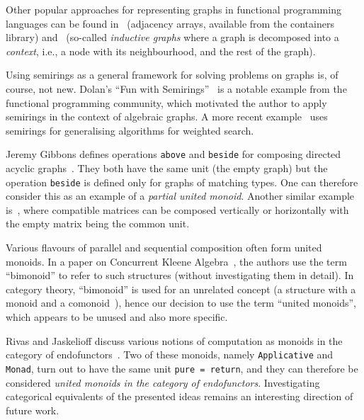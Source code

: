 \documentclass[english,submission]{programming}
\newcommand{\code}[1]{\lstinline[mathescape]|#1|}
\newcommand{\hcode}[1]{{\color{darkblue} \lstinline[keywordstyle={}]|#1|}} %
\begin{document}
Other popular approaches for representing graphs in functional programming
languages can be found in~\cite{1995_king_graphs}\cite{1994_launchbury_st}
(adjacency arrays, available from the \textsf{containers} library)
and~\cite{2001_erwig_inductive} (so-called \emph{inductive graphs} where a graph
is decomposed into a \emph{context}, i.e., a node with its neighbourhood, and
the rest of the graph).

Using semirings as a general framework for solving problems on graphs is, of
course, not new. Dolan's ``Fun with Semirings''~\cite{2013_semirings_dolan} is a
notable example from the functional programming community, which motivated the
author to apply semirings in the context of algebraic graphs. A more recent
example~\cite{weighted_search} uses semirings for generalising algorithms for
weighted search.


Jeremy Gibbons defines operations \code{above} and \code{beside} for composing
directed acyclic graphs~\cite{1995_gibbons_algebra}. They both have the same
unit (the empty graph) but the operation \code{beside} is defined only for
graphs of matching types. One can therefore consider this as an example of a
\emph{partial united monoid}. Another similar example is~\cite{typed_matrices},
where compatible matrices can be composed vertically or horizontally with the
empty matrix being the common unit.

Various flavours of parallel and sequential composition often form united
monoids. In a paper on Concurrent Kleene Algebra~\cite{hoare2011concurrent},
the authors use the term ``bimonoid'' to refer to such structures (without
investigating them in detail). In category theory, ``bimonoid'' is used for an
unrelated concept (a structure with a monoid and a
comonoid~\cite{porst_bimonoids}), hence our decision to use the term
``united monoids'', which appears to be unused and also more specific.

Rivas and Jaskelioff discuss various notions of computation as monoids in the
category of endofunctors~\cite{rivas_jaskelioff_2017}. Two of these monoids,
namely \hcode{Applicative} and \hcode{Monad}, turn out to have the same unit
\hcode{pure = return}, and they can therefore be considered \emph{united monoids
in the category of endofunctors}. Investigating categorical equivalents of
the presented ideas remains an interesting direction of future work.


\printbibliography
\end{document}
